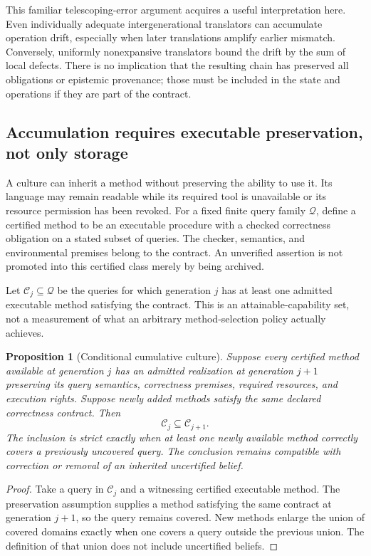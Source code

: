 \documentclass[11pt,letterpaper]{article}
\theoremstyle{plain}
\newtheorem{proposition}{Proposition}[section]
\theoremstyle{definition}
\theoremstyle{remark}
\begin{document}
This familiar telescoping-error argument acquires a useful interpretation here. Even individually adequate intergenerational translators can accumulate operation drift, especially when later translations amplify earlier mismatch. Conversely, uniformly nonexpansive translators bound the drift by the sum of local defects. There is no implication that the resulting chain has preserved all obligations or epistemic provenance; those must be included in the state and operations if they are part of the contract.


\subsection{Accumulation requires executable preservation, not only storage}
A culture can inherit a method without preserving the ability to use it. Its language may remain readable while its required tool is unavailable or its resource permission has been revoked. For a fixed finite query family $\mathcal Q$, define a certified method to be an executable procedure with a checked correctness obligation on a stated subset of queries. The checker, semantics, and environmental premises belong to the contract. An unverified assertion is not promoted into this certified class merely by being archived.

Let $\mathcal C_j\subseteq\mathcal Q$ be the queries for which generation $j$ has at least one admitted executable method satisfying the contract. This is an attainable-capability set, not a measurement of what an arbitrary method-selection policy actually achieves.

\begin{proposition}[Conditional cumulative culture]\label{prop:culturegrowth}
Suppose every certified method available at generation $j$ has an admitted realization at generation $j+1$ preserving its query semantics, correctness premises, required resources, and execution rights. Suppose newly added methods satisfy the same declared correctness contract. Then
\[
\mathcal C_j\subseteq\mathcal C_{j+1}.
\]
The inclusion is strict exactly when at least one newly available method correctly covers a previously uncovered query. The conclusion remains compatible with correction or removal of an inherited \emph{uncertified} belief.
\end{proposition}
\begin{proof}
Take a query in $\mathcal C_j$ and a witnessing certified executable method. The preservation assumption supplies a method satisfying the same contract at generation $j+1$, so the query remains covered. New methods enlarge the union of covered domains exactly when one covers a query outside the previous union. The definition of that union does not include uncertified beliefs.
\end{proof}
\end{document}
